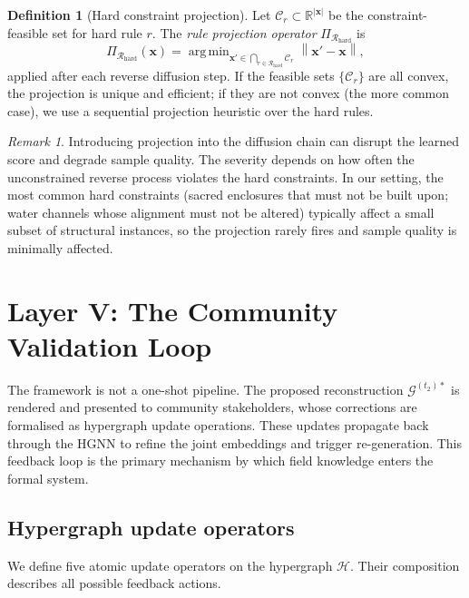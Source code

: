 \documentclass[11pt,a4paper]{article}
\theoremstyle{plain}
\theoremstyle{definition}
\newtheorem{definition}[theorem]{Definition}
\theoremstyle{remark}
\newtheorem{remark}[theorem]{Remark}
\newcommand{\norm}[1]{\left\lVert #1 \right\rVert}
\DeclareMathOperator*{\argmin}{arg\,min}
\newcommand{\GS}{\mathcal{G}}
\newcommand{\HG}{\mathcal{H}}
\newcommand{\Rul}{\mathcal{R}}
\begin{document}
\begin{definition}[Hard constraint projection]
\label{def:projection}
Let $\mathcal{C}_r \subset \mathbb{R}^{|\mathbf{x}|}$ be the
constraint-feasible set for hard rule $r$. The \emph{rule projection
operator} $\Pi_{\Rul_{\mathrm{hard}}}$ is
\[
  \Pi_{\Rul_{\mathrm{hard}}}(\mathbf{x})
  = \argmin_{\mathbf{x}' \in
    \bigcap_{r \in \Rul_{\mathrm{hard}}} \mathcal{C}_r}
    \norm{\mathbf{x}' - \mathbf{x}},
\]
applied after each reverse diffusion step. If the feasible sets
$\{\mathcal{C}_r\}$ are all convex, the projection is unique and
efficient; if they are not convex (the more common case), we use
a sequential projection heuristic over the hard rules.
\end{definition}

\begin{remark}
Introducing projection into the diffusion chain can disrupt the
learned score and degrade sample quality. The severity depends on
how often the unconstrained reverse process violates the hard
constraints. In our setting, the most common hard constraints
(sacred enclosures that must not be built upon; water channels whose
alignment must not be altered) typically affect a small subset of
structural instances, so the projection rarely fires and sample
quality is minimally affected.
\end{remark}

\section{Layer V: The Community Validation Loop}
\label{sec:layer5}

The framework is not a one-shot pipeline. The proposed reconstruction
$\GS^{(t_2)*}$ is rendered and presented to community stakeholders,
whose corrections are formalised as hypergraph update operations.
These updates propagate back through the HGNN to refine the joint
embeddings and trigger re-generation. This feedback loop is the
primary mechanism by which field knowledge enters the formal system.

\subsection{Hypergraph update operators}
\label{sec:layer5_operators}

We define five atomic update operators on the hypergraph $\HG$.
Their composition describes all possible feedback actions.
\end{document}
